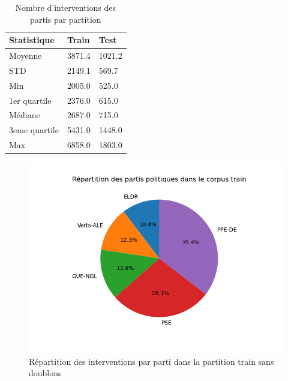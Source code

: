 \begin{table}[ht]
    \centering
\begin{tabular}{|l|l|l|}
\hline
Statistique & Train & Test \\ \hline
Moyenne & 3871.4 & 1021.2 \\ \hline
STD & 2149.1 & 569.7 \\ \hline
Min & 2005.0 & 525.0 \\ \hline
1er quartile & 2376.0 & 615.0 \\ \hline
Médiane & 2687.0 & 715.0\\ \hline
3eme quartile & 5431.0 & 1448.0\\ \hline
Max & 6858.0 & 1803.0\\ \hline
\end{tabular}
\caption{Nombre d'interventions des partis par partition}
\label{tab:stats_dataset}
\end{table}

\begin{figure}[ht]
    \centering
    \includegraphics[width=\columnwidth]{../stats/occurences_par_partis_train_camember.png}
    \caption{Répartition des interventions par parti dans la partition train sans doublons}
    \label{fig:camember_dataset}
\end{figure}
